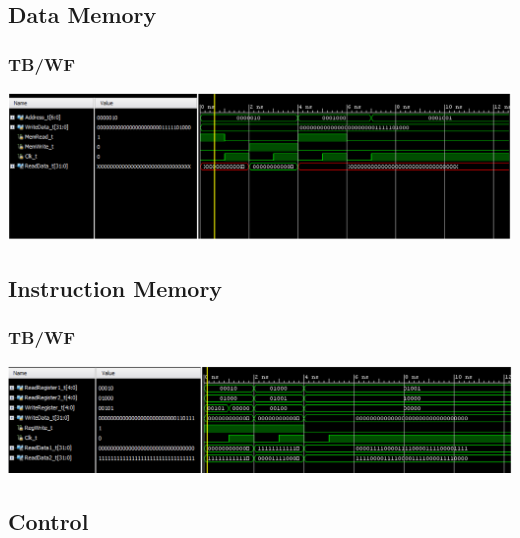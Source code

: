 \documentclass{llncs}
\begin{document}
\subsection{Data Memory}
\label{eq:1}
\begin{addmargin}[-5em]{-2em}

\end{addmargin}
\subsubsection{TB/WF}
\begin{addmargin}[-5em]{-2em}
  
\end{addmargin}
\includegraphics[scale=.2]{images/datamemory.png}



\subsection{Instruction Memory}
\label{inst:1}
\begin{addmargin}[-5em]{-6em}
  
\end{addmargin}
\subsubsection{ TB/WF}
\begin{addmargin}[-5em]{-6em}
  
\end{addmargin}
\includegraphics[scale=.2]{images/instmemory.png}
\subsection{Control}%
\label{c:1}
\begin{addmargin}[-5em]{-6em}
  
\end{addmargin}
\end{document}
